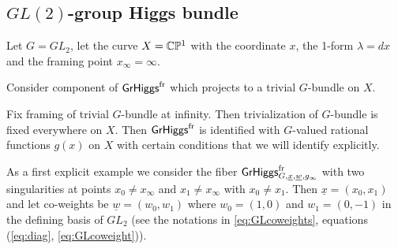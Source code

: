 \documentclass[12pt,psamsfonts,reqno]{amsart}
\begin{document}
\subsection{$GL(2)$-group Higgs bundle}

Let $G=GL_2$, let the curve $X = \mathbb C \mathbb P^1$ with the coordinate $x$, the 1-form
$\lambda = dx$ and the framing point $x_\infty = \infty$.

Consider component of $\mathsf{GrHiggs}^{\mathrm{fr}}$ which projects to a trivial $G$-bundle on $X$.

Fix framing of trivial $G$-bundle at infinity. Then trivialization of $G$-bundle is fixed everywhere on $X$. Then $\mathsf{GrHiggs}^{\mathrm{fr}}$ is identified with $G$-valued
rational functions $g(x)$ on $X$ with certain conditions that we will identify explicitly.


As a first explicit example we consider the fiber $\mathsf{GrHiggs}^{\mathrm{fr}}_{G, \underline{x}, \underline{w}, g_\infty}$ with two singularities at points $x_0 \neq x_\infty$ and $x_1\neq x_\infty$ with $x_0 \neq x_1$.  
 Then $\underline{x}=(x_0,x_1)$ and let 
 co-weights be $\underline{w} = (w_0, w_1)$ where $w_0 = (1,0)$ and $w_1 = (0,-1)$ in the defining basis of $GL_2$ (see the notations in \ref{eq:GLcoweights},
 equations (\ref{eq:diag}, \ref{eq:GLcoweight})).
 


 
\end{document}
